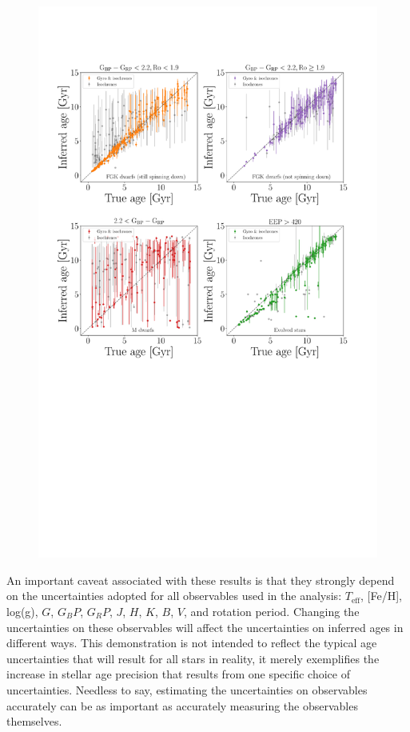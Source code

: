 \documentclass[useAMS, usenatbib, preprint, 12pt]{aastex}
\newcommand{\teff}{$T_{\mathrm{eff}}$}
\newcommand{\feh}{[Fe/H]}
\newcommand{\logg}{log(g)}
\begin{document}
\begin{figure}
    \includegraphics[width=1\textwidth]{simulation_results}
\label{fig:simulation_results}
\end{figure}

An important caveat associated with these results is that they strongly depend
on the uncertainties adopted for all observables used in the analysis: \teff,
\feh, \logg, $G$, $G_BP$, $G_RP$, $J$, $H$, $K$, $B$, $V$, and rotation
period.
Changing the uncertainties on these observables will affect the uncertainties
on inferred ages in different ways.
This demonstration is not intended to reflect the typical age uncertainties
that will result for all stars in reality, it merely exemplifies the increase
in stellar age precision that results from one specific choice of
uncertainties.
Needless to say, estimating the uncertainties on observables accurately can be
as important as accurately measuring the observables themselves.
\end{document}

